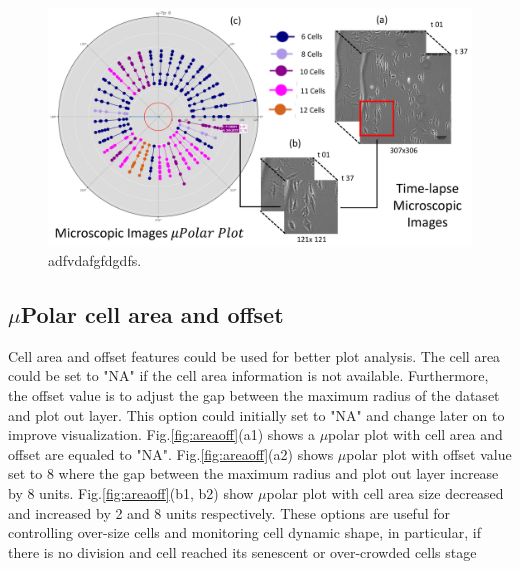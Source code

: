 \documentclass[conference]{IEEEtran}
\begin{document}
\begin{figure}
\centering
\includegraphics[width=\textwidth,height=10 cm]{Patterns/microscopic.pdf}
\caption{ adfvdafgfdgdfs.}
\label{fig:scopic}
\end{figure}


\subsection{$\mu$Polar cell area and offset}

Cell area and offset features could be used for better plot analysis. The cell area could be set to "NA" if the cell area information is not available. Furthermore, the offset value is to adjust the gap between the maximum radius of the dataset and plot out layer. This option could initially set to "NA" and change later on to improve visualization. Fig.\ref{fig:areaoff}(a1) shows a $\mu$polar plot with cell area and offset are equaled to "NA". Fig.\ref{fig:areaoff}(a2) shows $\mu$polar plot with offset value set to 8 where the gap between the maximum radius and plot out layer increase by 8 units. Fig.\ref{fig:areaoff}(b1, b2) show $\mu$polar plot with cell area size decreased and increased by 2 and 8 units respectively. These options are useful for controlling over-size cells and monitoring cell dynamic shape, in particular, if there is no division and cell reached its senescent or over-crowded cells stage    
\end{document}
